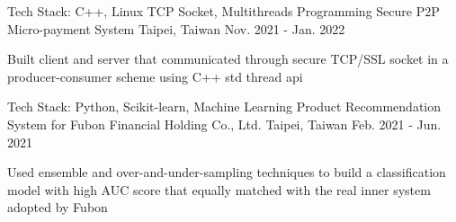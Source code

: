 \begin{cventries}
  \cventry
    {\color{awesome} Tech Stack: C++, Linux TCP Socket, Multithreads Programming} %
    {Secure P2P Micro-payment System}
    {Taipei, Taiwan} %
    {Nov. 2021 - Jan. 2022} %
    {
      \begin{cvitems} %
        \item {Built client and server that communicated through secure TCP/SSL socket in a producer-consumer scheme using C++ std thread api}
      \end{cvitems}
    }

  \cventry
    {\color{awesome} Tech Stack: Python, Scikit-learn, Machine Learning} %
    {Product Recommendation System for Fubon Financial Holding Co., Ltd.}
    {Taipei, Taiwan} %
    {Feb. 2021 - Jun. 2021} %
    {
      \begin{cvitems} %
        \item {Used ensemble and over-and-under-sampling techniques to build a classification model with high AUC score that equally matched with the real inner system adopted by Fubon}
      \end{cvitems}
    }


\end{cventries}
